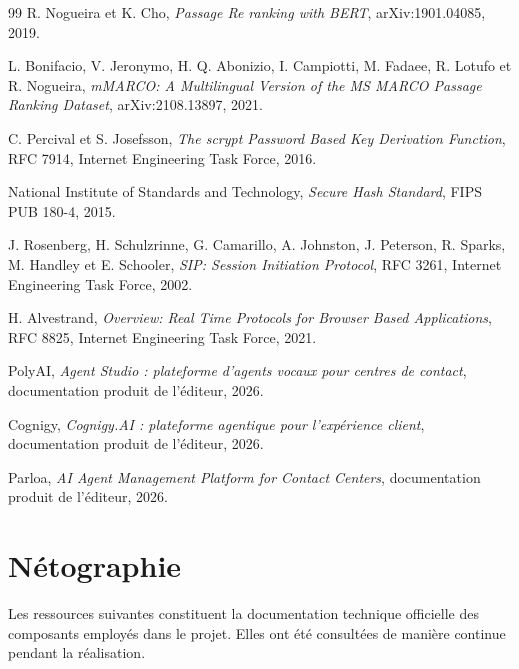 \begin{thebibliography}{99}
R. Nogueira et K. Cho,
\textit{Passage Re ranking with BERT},
arXiv:1901.04085, 2019.

L. Bonifacio, V. Jeronymo, H. Q. Abonizio, I. Campiotti, M. Fadaee, R. Lotufo et R. Nogueira,
\textit{mMARCO: A Multilingual Version of the MS MARCO Passage Ranking Dataset},
arXiv:2108.13897, 2021.

C. Percival et S. Josefsson,
\textit{The scrypt Password Based Key Derivation Function},
RFC 7914, Internet Engineering Task Force, 2016.

National Institute of Standards and Technology,
\textit{Secure Hash Standard},
FIPS PUB 180-4, 2015.

J. Rosenberg, H. Schulzrinne, G. Camarillo, A. Johnston, J. Peterson, R. Sparks, M. Handley
et E. Schooler,
\textit{SIP: Session Initiation Protocol},
RFC 3261, Internet Engineering Task Force, 2002.

H. Alvestrand,
\textit{Overview: Real Time Protocols for Browser Based Applications},
RFC 8825, Internet Engineering Task Force, 2021.

PolyAI, \textit{Agent Studio : plateforme d'agents vocaux pour centres de contact},
documentation produit de l'éditeur, 2026.

Cognigy, \textit{Cognigy.AI : plateforme agentique pour l'expérience client},
documentation produit de l'éditeur, 2026.

Parloa, \textit{AI Agent Management Platform for Contact Centers},
documentation produit de l'éditeur, 2026.

\end{thebibliography}

\newpage

\chapter*{Nétographie}

Les ressources suivantes constituent la documentation technique officielle des composants
employés dans le projet. Elles ont été consultées de manière continue pendant la réalisation.

